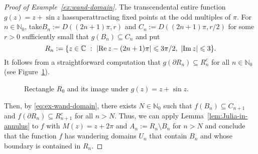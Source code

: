 \documentclass[a4paper, 12pt, reqno]{amsart}
\numberwithin{equation}{section}
\theoremstyle{plain}
\theoremstyle{definition}
\theoremstyle{remark}
\newcommand{\C}{{\mathbb{C}}}
\newcommand{\Z}{{\mathbb{Z}}}
\newcommand{\N}{{\mathbb{N}}}
\renewcommand{\Re}{\operatorname{Re}}
\begin{document}
\begin{proof}[Proof of Example~\ref{ex:wand-domain}]
 


The transcendental entire function $g(z)=z+\sin z$ has\linebreak superattracting fixed points at the odd multiples of $\pi$. For $n\in\N_0$, take\linebreak \mbox{$B_n := D((2n+1)\pi,r)$} and $C_n:=D((2n+1)\pi,r/2)$ for some $r>0$ sufficiently small that \mbox{$g(B_n)\subseteq C_{n}$} and put
$$
R_n:= \{z\in \C\ :\ |\textup{Re}\, z-(2n+1)\pi|\leqslant 3\pi/2,\ |\textup{Im}\, z|\leqslant 3\}.
$$
It follows from a straightforward computation that $g(\partial R_n)\subseteq R_n^c$ for all $n\in\N_0$ (see Figure~\ref{fig:spiral}). 


\begin{figure}[h!]
\centering
\def\svgwidth{.65\linewidth}
 
\caption[Image of a rectangle by the map~\mbox{$g(z)=z+\sin z$}]{Rectangle $R_0$ and its image under $g(z)=z+\sin z$.}
\label{fig:spiral}
\end{figure}


Then, by \eqref{eq:ex-wand-domain}, there exists $N\in\N_0$ such that $f(B_n)\subseteq C_{n+1}$ and $f(\partial R_n)\subseteq R_{n+1}^c$ for all $n>N$. Thus, we can apply Lemma~\ref{lem:Julia-in-annulus} to $f$ with $M(z)=z+2\pi$ and $A_n:=R_n\setminus B_n$ for $n>N$ and conclude that the function $f$ has wandering domains $U_n$ that contain $B_n$ and whose boundary is contained in $R_n$.
\end{proof}
\end{document}
